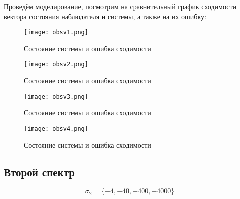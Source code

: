 Проведём моделирование, посмотрим на сравнительный график сходимости вектора состояния наблюдателя и системы, а также на их ошибку:
\newpage
\begin{figure}[ht]
  \centering
  \texttt{[image: obsv1.png]}
  \caption{Состояние системы и ошибка сходимости}
\end{figure}
\begin{figure}[ht]
  \centering
  \texttt{[image: obsv2.png]}
  \caption{Состояние системы и ошибка сходимости}
\end{figure}
\newpage
\begin{figure}[ht]
  \centering
  \texttt{[image: obsv3.png]}
  \caption{Состояние системы и ошибка сходимости}
\end{figure}
\begin{figure}[ht]
  \centering
  \texttt{[image: obsv4.png]}
  \caption{Состояние системы и ошибка сходимости}
\end{figure}


\newpage
\subsection{Второй спектр}
$$
  \sigma_2 = \{-4,-40,-400,-4000\}
$$

